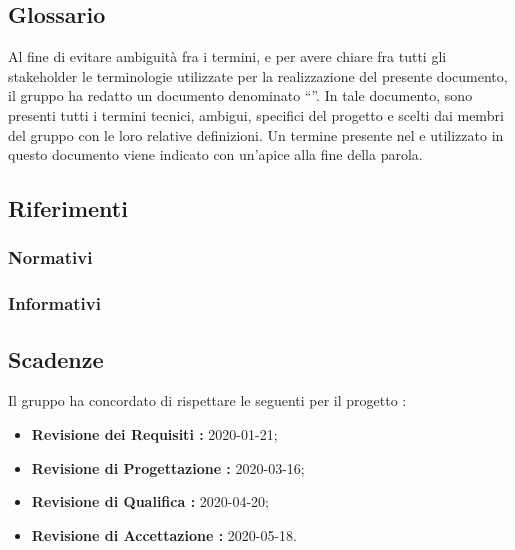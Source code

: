 \subsection{Glossario}
Al fine di evitare ambiguità fra i termini, e per avere chiare fra tutti gli stakeholder le terminologie utilizzate per la realizzazione del presente documento, il gruppo \Gruppo{} ha redatto un documento denominato “”.
In tale documento, sono presenti tutti i termini tecnici, ambigui, specifici del progetto e scelti dai membri del gruppo con le loro relative definizioni.
Un termine presente nel  e utilizzato in questo documento viene indicato con un'apice  alla fine della parola.

\subsection{Riferimenti}
\subsubsection{Normativi}
\subsubsection{Informativi}

\subsection{Scadenze}
Il gruppo \Gruppo{} ha concordato di rispettare le seguenti  per il progetto \NomeProgetto{}:
\begin{itemize}
    \item \textbf{Revisione dei Requisiti : } 2020-01-21;
    \item \textbf{Revisione di Progettazione : } 2020-03-16;
    \item \textbf{Revisione di Qualifica : } 2020-04-20;
    \item \textbf{Revisione di Accettazione : } 2020-05-18.
\end{itemize}